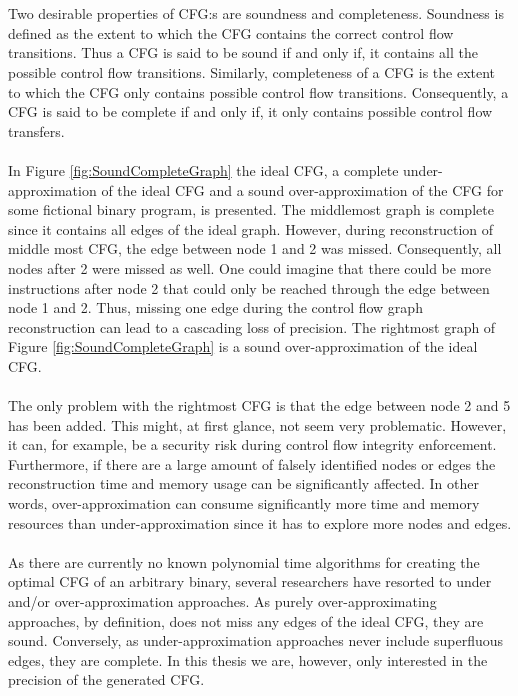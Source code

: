 \documentclass{kththesis}
\begin{document}
\\ \\
Two desirable properties of CFG:s are soundness and completeness\cite{angr}. Soundness is defined as the extent to which the CFG contains the correct control flow transitions. Thus a CFG is said to be sound if and only if, it contains all the possible control flow transitions. Similarly, completeness of a CFG is the extent to which the CFG only contains possible control flow transitions. Consequently, a CFG is said to be complete if and only if, it only contains possible control flow transfers. 
\\ \\
In Figure \ref{fig:SoundCompleteGraph} the ideal CFG, a complete under-approximation of the ideal CFG and a sound over-approximation of the CFG for some fictional binary program, is presented. The middlemost graph is complete since it contains all edges of the ideal graph. However, during reconstruction of middle most CFG, the edge between node 1 and 2 was missed. Consequently, all nodes after 2 were missed as well. One could imagine that there could be more instructions after node 2 that could only be reached through the edge between node 1 and 2. Thus, missing one edge during the control flow graph reconstruction can lead to a cascading loss of precision. The rightmost graph of Figure \ref{fig:SoundCompleteGraph} is a sound over-approximation of the ideal CFG.
\\ \\
The only problem with the rightmost CFG is that the edge between node 2 and 5 has been added. This might, at first glance, not seem very problematic. However, it can, for example, be a security risk during control flow integrity enforcement. Furthermore, if there are a large amount of falsely identified nodes or edges the reconstruction time and memory usage can be significantly affected. In other words, over-approximation can consume significantly more time and memory resources than under-approximation since it has to explore more nodes and edges\cite{alternating}.
\\ \\
As there are currently no known polynomial time algorithms for creating the optimal CFG of an arbitrary binary, several researchers have resorted to under and/or over-approximation approaches\cite{preciseCFGBoolean}\cite{preciseCFG}\cite{CFGFromPowerPC}\cite{angr}. As purely over-approximating approaches, by definition, does not miss any edges of the ideal CFG, they are sound. Conversely, as under-approximation approaches never include superfluous edges, they are complete. In this thesis we are, however, only interested in the precision of the generated CFG.
\end{document}
